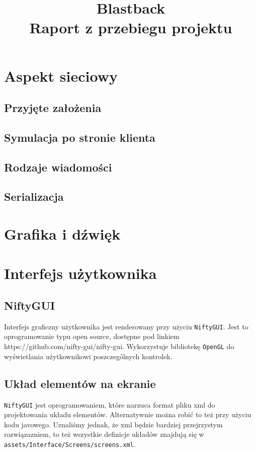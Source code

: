 \documentclass[]{report}
\newcommand{\code}[1]{\colorbox{codegray}{\texttt{#1}}}
\begin{document}
\title{Blastback \\
	\Large Raport z przebiegu projektu}
\maketitle



\chapter*{Aspekt sieciowy}
\section{Przyjęte założenia}
\section{Symulacja po stronie klienta}
\section{Rodzaje wiadomości}
\section{Serializacja}



\chapter*{Grafika i dźwięk}



\chapter*{Interfejs użytkownika}
\section{NiftyGUI}
Interfejs graficzny użytkownika jest renderowany przy użyciu \code{NiftyGUI}. Jest to oprogramowanie typu open source, dostępne pod linkiem https://github.com/nifty-gui/nifty-gui. Wykorzystuje bibliotekę \code{OpenGL} do wyświetlania użytkownikowi poszczególnych kontrolek.

\section{Układ elementów na ekranie}
\code{NiftyGUI} jest oprogramowaniem, które narzuca format pliku xml do projektowania układu elementów. Alternatywnie można robić to też przy użyciu kodu javowego. Uznaliśmy jednak, że xml będzie bardziej przejrzystym rozwiązazniem, to też wszystkie definicje układów znajdują się w \code{assets/Interface/Screens/screens.xml}.
\end{document}
